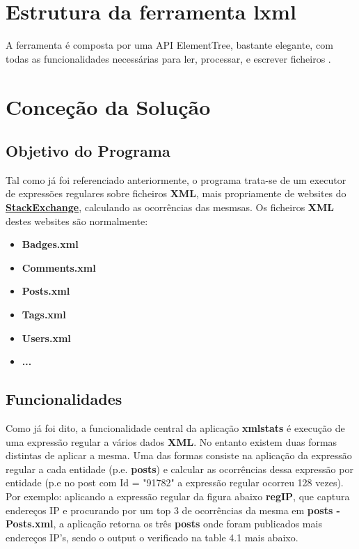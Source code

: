 \documentclass[11pt,a4paper]{report}%
\begin{document}
\chapter{Estrutura da ferramenta lxml}
A ferramenta  é composta por uma API ElementTree, bastante elegante, com todas as funcionalidades necessárias para ler, processar, e escrever ficheiros .

\chapter{Conceção da Solução}

\section{Objetivo do Programa}
Tal como já foi referenciado anteriormente, o programa trata-se de um executor de expressões regulares sobre ficheiros \textbf{XML}, mais propriamente de websites do \textbf{\href{https://archive.org/download/stackexchange}{StackExchange}}, calculando as ocorrências das mesmsas. Os ficheiros \textbf{XML} destes websites são normalmente:

\begin{itemize}
    \item \textbf{Badges.xml}
    \item \textbf{Comments.xml}
    \item \textbf{Posts.xml}
    \item \textbf{Tags.xml}
    \item \textbf{Users.xml}
    \item \textbf{...}
\end{itemize}{}

\section{Funcionalidades}
Como já foi dito, a funcionalidade central da aplicação \textbf{xmlstats} é execução de uma expressão regular a vários dados \textbf{XML}. No entanto existem duas formas distintas de aplicar a mesma. \newline \newline Uma das formas consiste na aplicação da expressão regular a cada entidade (p.e. \textbf{posts}) e calcular as ocorrências dessa expressão por entidade (p.e no post com Id = "91782" a expressão regular ocorreu 128 vezes). \newline Por exemplo: aplicando a expressão regular da figura abaixo \textbf{regIP}, que captura endereços IP e procurando por um top 3 de ocorrências da mesma em \textbf{posts - Posts.xml}, a aplicação retorna os três \textbf{posts} onde foram publicados mais endereços IP's, sendo o output o verificado na table 4.1 mais abaixo.
\end{document}
